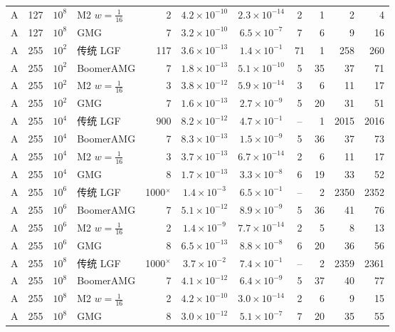 \begin{longtable}{lrrlrcccrrr}
A & 127 & $10^{8}$ & M2 $w{=}\frac1{16}$ & 2 & $4.2{\times}10^{-10}$ & $2.3{\times}10^{-14}$ & 2 & 1 & 2 & 4 \\
A & 127 & $10^{8}$ & GMG & 7 & $3.2{\times}10^{-10}$ & $6.5{\times}10^{-7}$ & 7 & 6 & 9 & 16 \\
A & 255 & $10^{2}$ & 传统 LGF & 117 & $3.6{\times}10^{-13}$ & $1.4{\times}10^{-1}$ & 71 & 1 & 258 & 260 \\
A & 255 & $10^{2}$ & BoomerAMG & 7 & $1.8{\times}10^{-13}$ & $5.1{\times}10^{-10}$ & 5 & 35 & 37 & 71 \\
A & 255 & $10^{2}$ & M2 $w{=}\frac1{16}$ & 3 & $3.8{\times}10^{-12}$ & $5.9{\times}10^{-14}$ & 3 & 6 & 11 & 17 \\
A & 255 & $10^{2}$ & GMG & 7 & $1.6{\times}10^{-13}$ & $2.7{\times}10^{-9}$ & 5 & 20 & 31 & 51 \\
A & 255 & $10^{4}$ & 传统 LGF & 900 & $8.2{\times}10^{-12}$ & $4.7{\times}10^{-1}$ & -- & 1 & 2015 & 2016 \\
A & 255 & $10^{4}$ & BoomerAMG & 7 & $8.3{\times}10^{-13}$ & $1.5{\times}10^{-9}$ & 5 & 36 & 37 & 73 \\
A & 255 & $10^{4}$ & M2 $w{=}\frac1{16}$ & 3 & $3.7{\times}10^{-13}$ & $6.7{\times}10^{-14}$ & 2 & 6 & 11 & 17 \\
A & 255 & $10^{4}$ & GMG & 8 & $1.7{\times}10^{-13}$ & $3.3{\times}10^{-8}$ & 6 & 19 & 33 & 52 \\
A & 255 & $10^{6}$ & 传统 LGF & 1000$^\times$ & $1.4{\times}10^{-3}$ & $6.5{\times}10^{-1}$ & -- & 2 & 2350 & 2352 \\
A & 255 & $10^{6}$ & BoomerAMG & 7 & $5.1{\times}10^{-12}$ & $8.9{\times}10^{-9}$ & 5 & 36 & 41 & 76 \\
A & 255 & $10^{6}$ & M2 $w{=}\frac1{16}$ & 2 & $1.4{\times}10^{-9}$ & $7.7{\times}10^{-14}$ & 2 & 5 & 8 & 13 \\
A & 255 & $10^{6}$ & GMG & 8 & $6.5{\times}10^{-13}$ & $8.8{\times}10^{-8}$ & 6 & 20 & 36 & 56 \\
A & 255 & $10^{8}$ & 传统 LGF & 1000$^\times$ & $3.7{\times}10^{-2}$ & $7.4{\times}10^{-1}$ & -- & 2 & 2359 & 2361 \\
A & 255 & $10^{8}$ & BoomerAMG & 7 & $4.1{\times}10^{-12}$ & $6.4{\times}10^{-9}$ & 5 & 37 & 40 & 77 \\
A & 255 & $10^{8}$ & M2 $w{=}\frac1{16}$ & 2 & $4.2{\times}10^{-10}$ & $3.0{\times}10^{-14}$ & 2 & 6 & 9 & 15 \\
A & 255 & $10^{8}$ & GMG & 8 & $3.0{\times}10^{-12}$ & $5.1{\times}10^{-7}$ & 7 & 20 & 35 & 55 \\

\end{longtable}
